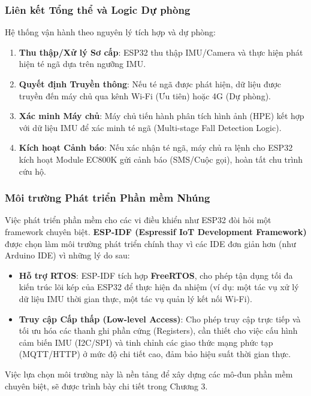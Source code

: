 \subsubsection{Liên kết Tổng thể và Logic Dự phòng}
Hệ thống vận hành theo nguyên lý tích hợp và dự phòng:
\begin{enumerate}
    \item \textbf{Thu thập/Xử lý Sơ cấp}: ESP32 thu thập IMU/Camera và thực hiện phát hiện té ngã dựa trên ngưỡng IMU.
    \item \textbf{Quyết định Truyền thông}: Nếu té ngã được phát hiện, dữ liệu được truyền đến máy chủ qua kênh Wi-Fi (Ưu tiên) hoặc 4G (Dự phòng).
    \item \textbf{Xác minh Máy chủ}: Máy chủ tiến hành phân tích hình ảnh (HPE) kết hợp với dữ liệu IMU để xác minh té ngã (Multi-stage Fall Detection Logic).
    \item \textbf{Kích hoạt Cảnh báo}: Nếu xác nhận té ngã, máy chủ ra lệnh cho ESP32 kích hoạt Module EC800K gửi cảnh báo (SMS/Cuộc gọi), hoàn tất chu trình cứu hộ.
\end{enumerate}

\subsubsection{Môi trường Phát triển Phần mềm Nhúng}
Việc phát triển phần mềm cho các vi điều khiển như ESP32 đòi hỏi một framework chuyên biệt. \textbf{ESP-IDF (Espressif IoT Development Framework)} được chọn làm môi trường phát triển chính thay vì các IDE đơn giản hơn (như Arduino IDE) vì những lý do sau:
\begin{itemize}
    \item \textbf{Hỗ trợ RTOS}: ESP-IDF tích hợp \textbf{FreeRTOS}, cho phép tận dụng tối đa kiến trúc lõi kép của ESP32 để thực hiện đa nhiệm (ví dụ: một tác vụ xử lý dữ liệu IMU thời gian thực, một tác vụ quản lý kết nối Wi-Fi).
    \item \textbf{Truy cập Cấp thấp (Low-level Access)}: Cho phép truy cập trực tiếp và tối ưu hóa các thanh ghi phần cứng (Registers), cần thiết cho việc cấu hình cảm biến IMU (I2C/SPI) và tinh chỉnh các giao thức mạng phức tạp (MQTT/HTTP) ở mức độ chi tiết cao, đảm bảo hiệu suất thời gian thực.
\end{itemize}
Việc lựa chọn môi trường này là nền tảng để xây dựng các mô-đun phần mềm chuyên biệt, sẽ được trình bày chi tiết trong Chương 3.
